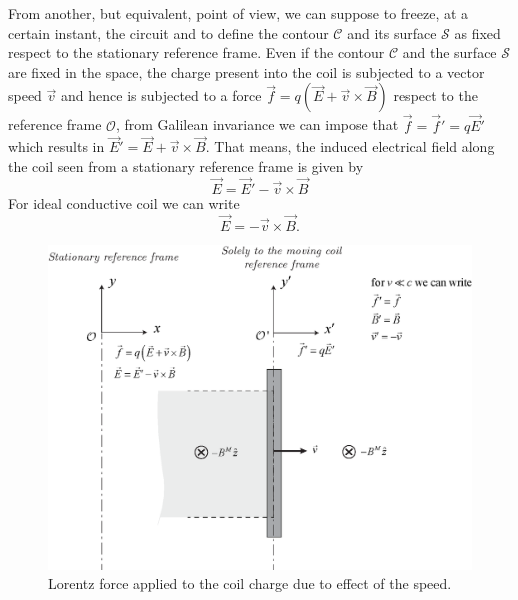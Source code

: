 \documentclass[11pt,a4paper,oneside]{book}
\numberwithin{equation}{section}
\theoremstyle{it}
\theoremstyle{definition}
\begin{document}
From another, but equivalent, point of view, we can suppose to freeze, at a 
certain instant, the circuit and to define the contour $\mathcal{C}$  and its 
surface $\mathcal{S}$ as fixed respect to the stationary reference frame. Even 
if the contour $\mathcal{C}$ and the surface $\mathcal{S}$ are fixed in the 
space, the charge present into the coil is subjected to a vector speed 
$\vec{v}$ and hence is subjected to a force $\vec{f}= 
q(\vec{E}+\vec{v}\times\vec{B})$ respect to the reference frame $\mathcal{O}$, 
from Galilean invariance we can impose that  $\vec{f}=\vec{f}'=q\vec{E}'$ which 
results in $\vec{E}'=\vec{E}+\vec{v}\times\vec{B}$. That means, the induced 
electrical field along the coil seen from a stationary reference frame is given 
by 
\begin{equation}\label{silvestrini_5}
	\vec{E}=\vec{E}'-\vec{v}\times\vec{B}
\end{equation}
For ideal conductive coil we can write $$\vec{E}=-\vec{v}\times\vec{B}.$$
\begin{figure}[H]
	\centering
	\includegraphics[width = 350pt, angle = 0, 
	keepaspectratio]{figures/appendix/moving_coil_4.eps}
	\captionsetup{width=0.75\textwidth}		
	\caption{Lorentz force applied to the coil charge due to effect of the 
	speed.}
	\label{moving_coil_4}
\end{figure}
\end{document}
